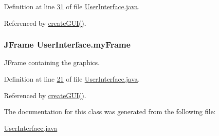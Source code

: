 Definition at line \hyperlink{UserInterface_8java_source_l00031}{31} of file \hyperlink{UserInterface_8java_source}{User\-Interface.\-java}.



Referenced by \hyperlink{UserInterface_8java_source_l00092}{create\-G\-U\-I()}.

\hypertarget{classUserInterface_a1bb844238b260f6d4ae1852b6b1e0b97}{
\subsubsection[{my\-Frame}]{\setlength{\rightskip}{0pt plus 5cm}J\-Frame User\-Interface.\-my\-Frame\hspace{0.3cm}{\ttfamily [private]}}}\label{classUserInterface_a1bb844238b260f6d4ae1852b6b1e0b97}
J\-Frame containing the graphics. 

Definition at line \hyperlink{UserInterface_8java_source_l00021}{21} of file \hyperlink{UserInterface_8java_source}{User\-Interface.\-java}.



Referenced by \hyperlink{UserInterface_8java_source_l00092}{create\-G\-U\-I()}.



The documentation for this class was generated from the following file\-:\begin{DoxyCompactItemize}
\item 
\hyperlink{UserInterface_8java}{User\-Interface.\-java}\end{DoxyCompactItemize}
